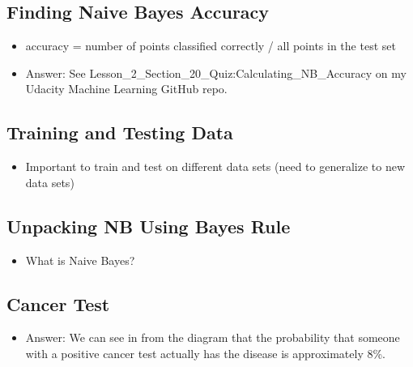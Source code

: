 \documentclass[12pt]{report}
\begin{document}
\subsection{Finding Naive Bayes Accuracy}

\begin{itemize}

\item accuracy = number of points classified correctly / all points in the test set

\item Answer: See Lesson\_2\_Section\_20\_Quiz:Calculating\_NB\_Accuracy on my Udacity Machine Learning GitHub repo. 

\end{itemize}

\subsection{Training and Testing Data}

\begin{itemize}

\item Important to train and test on different data sets (need to generalize to new data sets)

\end{itemize}

\subsection{Unpacking NB Using Bayes Rule}

\begin{itemize}

\item What is Naive Bayes?

\end{itemize}

\subsection{Cancer Test}

\begin{itemize}

\item Answer: We can see in from the diagram that the probability that someone with a positive cancer test actually has the disease is approximately 8\%. 

\end{itemize}
\end{document}
